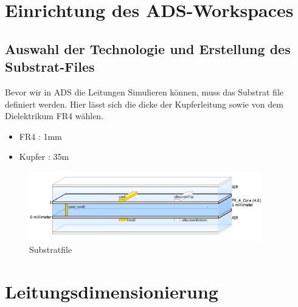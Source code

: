 \section{Einrichtung des ADS-Workspaces}

    \subsection{Auswahl der Technologie und Erstellung des Substrat-Files}
    Bevor wir in ADS die Leitungen Simulieren können, muss das Substrat file definiert werden.
    Hier lässt sich die dicke der Kupferleitung sowie von dem Dielektrikum FR4 wählen.
        \begin{itemize}
            \item FR4    : 1mm
            \item Kupfer : 35\textmu m
        \end{itemize}
        \begin{figure}[H]
            \centering
            \includegraphics[width=0.9\textwidth]{Pictures/substratFile.png}
            \caption{Substratfile}
        \end{figure}

   

\section{Leitungsdimensionierung}
